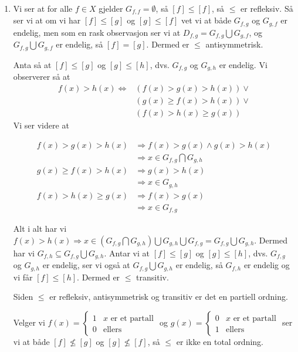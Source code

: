 \documentclass{article}[norsk]
\begin{document}
\begin{enumerate}[label=(\roman*)]
    \item Vi ser at for alle $f\in X$ gjelder $G_{f,f}=\emptyset$, så $[f]\leq[f]$, så $\leq$ er refleksiv. Så ser vi at om vi har $[f]\leq[g]$ og $[g]\leq[f]$ vet vi at både $G_{f,g}$ og $G_{g,f}$ er endelig, men som en rask observasjon ser vi at $D_{f,g}=G_{f,g}\bigcup G_{g,f}$, og $G_{f,g}\bigcup G_{g,f}$ er endelig, så $[f]=[g]$. Dermed er $\leq$ antisymmetrisk.
    
    Anta så at $[f]\leq[g]$ og $[g]\leq[h]$, dvs. $G_{f,g}$ og $G_{g,h}$ er endelig. Vi observerer så at
    \begin{equation*} \begin{aligned}
    	f(x)>h(x)\Longleftrightarrow &\left(f(x)>g(x)>h(x)\right)\vee\\
        &\left(g(x)\geq f(x)>h(x)\right)\vee\\
        &\left(f(x)>h(x)\geq g(x)\right)
    \end{aligned} \end{equation*}
    Vi ser videre at
    
    \begin{equation*} \begin{aligned}
    f(x)>g(x)>h(x)		&\Rightarrow f(x)>g(x)\wedge g(x)>h(x)	\\&\Rightarrow x\in G_{f,g}\bigcap G_{g,h}\\
    g(x)\geq f(x) > h(x)	&\Rightarrow g(x)>h(x)		\\&\Rightarrow x\in G_{g,h}\\
    f(x)>h(x)\geq g(x)		&\Rightarrow f(x)>g(x)		\\&\Rightarrow  x\in G_{f,g}
    \end{aligned} \end{equation*}
    
    Alt i alt har vi $f(x)>h(x)\Longrightarrow x\in \left(G_{f,g}\bigcap G_{g,h}\right)\bigcup G_{g,h}\bigcup G_{f,g}=G_{f,g}\bigcup G_{g,h}$. Dermed har vi $G_{f,h}\subseteq G_{f,g}\bigcup G_{g,h}$.   Antar vi at $[f]\leq[g]$ og $[g]\leq[h]$, dvs. $G_{f,g}$ og $G_{g,h}$ er endelig, ser vi også at $G_{f,g}\bigcup G_{g,h}$ er endelig, så $G_{f,h}$ er endelig og vi får $[f]\leq[h]$. Dermed er $\leq$ transitiv.
    
    Siden $\leq$ er refleksiv, antisymmetrisk og transitiv er det en partiell ordning.
    
    Velger vi 
    $\displaystyle f(x)= \begin{cases}
    	1	&x \text{ er et partall}\\
        0	&\text{ellers}
	\end{cases}$ og 
    $\displaystyle g(x) = \begin{cases}
    	0	&x \text{ er et partall}\\
        1 	&\text{ellers}
	\end{cases}$ ser vi at både $[f]\nleq[g]$ og $[g]\nleq[f]$, så $\leq$ er ikke en total ordning.
\end{enumerate}
\end{document}
